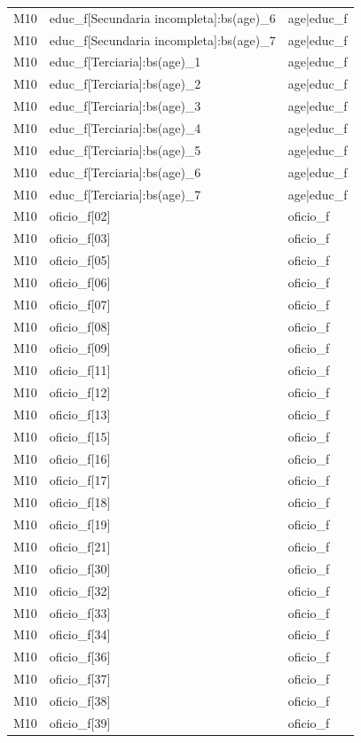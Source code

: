 \begin{longtable}{lll}
M10 & educ\_f[Secundaria incompleta]:bs(age)\_6 & age|educ\_f \\
M10 & educ\_f[Secundaria incompleta]:bs(age)\_7 & age|educ\_f \\
M10 & educ\_f[Terciaria]:bs(age)\_1 & age|educ\_f \\
M10 & educ\_f[Terciaria]:bs(age)\_2 & age|educ\_f \\
M10 & educ\_f[Terciaria]:bs(age)\_3 & age|educ\_f \\
M10 & educ\_f[Terciaria]:bs(age)\_4 & age|educ\_f \\
M10 & educ\_f[Terciaria]:bs(age)\_5 & age|educ\_f \\
M10 & educ\_f[Terciaria]:bs(age)\_6 & age|educ\_f \\
M10 & educ\_f[Terciaria]:bs(age)\_7 & age|educ\_f \\
M10 & oficio\_f[02] & oficio\_f \\
M10 & oficio\_f[03] & oficio\_f \\
M10 & oficio\_f[05] & oficio\_f \\
M10 & oficio\_f[06] & oficio\_f \\
M10 & oficio\_f[07] & oficio\_f \\
M10 & oficio\_f[08] & oficio\_f \\
M10 & oficio\_f[09] & oficio\_f \\
M10 & oficio\_f[11] & oficio\_f \\
M10 & oficio\_f[12] & oficio\_f \\
M10 & oficio\_f[13] & oficio\_f \\
M10 & oficio\_f[15] & oficio\_f \\
M10 & oficio\_f[16] & oficio\_f \\
M10 & oficio\_f[17] & oficio\_f \\
M10 & oficio\_f[18] & oficio\_f \\
M10 & oficio\_f[19] & oficio\_f \\
M10 & oficio\_f[21] & oficio\_f \\
M10 & oficio\_f[30] & oficio\_f \\
M10 & oficio\_f[32] & oficio\_f \\
M10 & oficio\_f[33] & oficio\_f \\
M10 & oficio\_f[34] & oficio\_f \\
M10 & oficio\_f[36] & oficio\_f \\
M10 & oficio\_f[37] & oficio\_f \\
M10 & oficio\_f[38] & oficio\_f \\
M10 & oficio\_f[39] & oficio\_f \\

\end{longtable}
